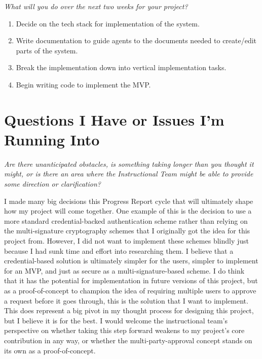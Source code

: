 \documentclass[12pt]{article}
\newcommand{\instruction}[1]{{\small\itshape #1}}
\begin{document}
\instruction{What will you do over the next two weeks for your project?}

\begin{enumerate}[leftmargin=1.5em, itemsep=2pt]
  \item Decide on the tech stack for implementation of the system.
  \item Write documentation to guide agents to the documents needed to create/edit parts of the system.
  \item Break the implementation down into vertical implementation tasks.
  \item Begin writing code to implement the MVP.
\end{enumerate}

\section*{Questions I Have or Issues I'm Running Into}

\instruction{Are there unanticipated obstacles, is something taking longer than you thought it might, or is there an area where the Instructional Team might be able to provide some direction or clarification?}

I made many big decisions this Progress Report cycle that will ultimately shape how my project will come together. One example of this is the decision to use a more standard credential-backed authentication scheme rather than relying on the multi-signature cryptography schemes that I originally got the idea for this project from. However, I did not want to implement these schemes blindly just because I had sunk time and effort into researching them. I believe that a credential-based solution is ultimately simpler for the users, simpler to implement for an MVP, and just as secure as a multi-signature-based scheme. I do think that it has the potential for implementation in future versions of this project, but as a proof-of-concept to champion the idea of requiring multiple users to approve a request before it goes through, this is the solution that I want to implement. This does represent a big pivot in my thought process for designing this project, but I believe it is for the best. I would welcome the instructional team's perspective on whether taking this step forward weakens to my project's core contribution in any way, or whether the multi-party-approval concept stands on its own as a proof-of-concept.
\end{document}
